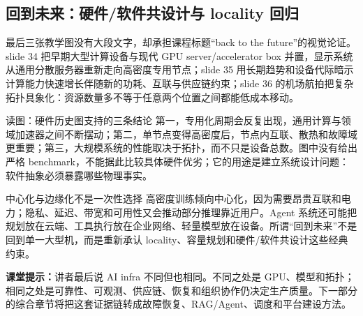 \subsection{回到未来：硬件/软件共设计与 locality 回归}

最后三张教学图没有大段文字，却承担课程标题“back to the future”的视觉论证。slide 34 把早期大型计算设备与现代 GPU server/accelerator box 并置，显示系统从通用分散服务器重新走向高密度专用节点；slide 35 用长期趋势和设备代际暗示计算能力快速增长伴随新的功耗、互联与供应链约束；slide 36 的机场航拍把复杂拓扑具象化：资源数量多不等于任意两个位置之间都能低成本移动。


\begin{knowledgebox}{读图：硬件历史图支持的三条结论}
第一，专用化周期会反复出现，通用计算与领域加速器之间不断摆动；第二，单节点变得高密度后，节点内互联、散热和故障域更重要；第三，大规模系统的性能取决于拓扑，而不只是设备总数。图中没有给出严格 benchmark，不能据此比较具体硬件优劣；它的用途是建立系统设计问题：软件抽象必须暴露哪些物理事实。
\end{knowledgebox}

\begin{warningbox}{中心化与边缘化不是一次性选择}
高密度训练倾向中心化，因为需要昂贵互联和电力；隐私、延迟、带宽和可用性又会推动部分推理靠近用户。Agent 系统还可能把规划放在云端、工具执行放在企业网络、轻量模型放在设备。所谓“回到未来”不是回到单一大型机，而是重新承认 locality、容量规划和硬件/软件共设计这些经典约束。
\end{warningbox}

\textbf{课堂提示：}讲者最后说 AI infra 不同但也相同。不同之处是 GPU、模型和拓扑；相同之处是可靠性、可观测、供应链、恢复和组织协作仍决定生产质量。下一部分的综合章节将把这套证据链转成故障恢复、RAG/Agent、调度和平台建设方法。

